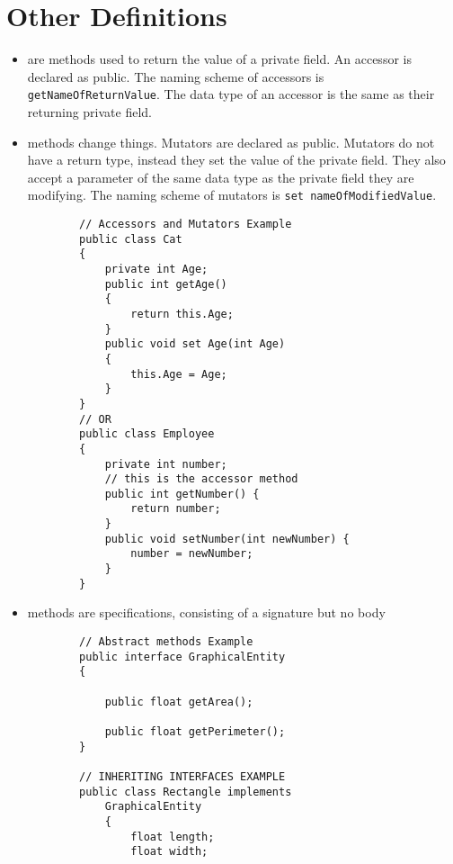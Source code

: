 \documentclass{article}
\begin{document}
\section{Other Definitions}
\begin{itemize}
    \item \label{itm:accessor}  are methods used to return the value of a private field. An accessor is declared as public. The naming scheme of accessors is \texttt{getNameOfReturnValue}. The data type of an accessor is the same as their returning private field.


    \item \label{itm:mutator}  methods change things. Mutators are declared as public. Mutators do not have a return type, instead they set the value of the private field. They also  accept a parameter of the same data type as the private field they are modifying. The naming scheme of mutators is \texttt{set  nameOfModifiedValue}.

    \begin{lstlisting}
        // Accessors and Mutators Example
        public class Cat 
        {  
            private int Age;  
            public int getAge() 
            {  
                return this.Age;  
            }  
            public void set Age(int Age) 
            {  
                this.Age = Age;  
            }  
        }
        // OR
        public class Employee 
        {  
            private int number; 
            // this is the accessor method
            public int getNumber() {  
                return number;  
            }  
            public void setNumber(int newNumber) {  
                number = newNumber;  
            }  
        } 
    \end{lstlisting}
    
     \item \label{itm:abstract}  methods are specifications, consisting of a signature but no body
     
    \begin{lstlisting}
        // Abstract methods Example
        public interface GraphicalEntity 
        {  
        
            public float getArea();

            public float getPerimeter();
        }
        
        // INHERITING INTERFACES EXAMPLE
        public class Rectangle implements
            GraphicalEntity 
            {
                float length;
                float width;
                

\end{lstlisting}
\end{itemize}
\end{document}
